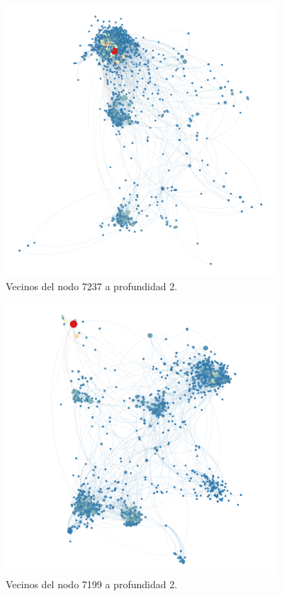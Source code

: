 \begin{figure}[ht]
    \centerfloat
    \includegraphics[width=0.9\textwidth]{img/resultados/grado-vector7237-prof2.png}
    \caption{Vecinos del nodo 7237 a profundidad 2.}
\end{figure}

\begin{figure}[ht]
    \centerfloat
    \includegraphics[width=0.9\textwidth]{img/resultados/grado-vector7199-prof2.png}
    \caption{Vecinos del nodo 7199 a profundidad 2.}
\end{figure}


